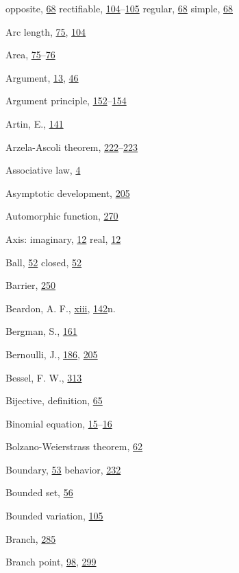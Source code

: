 \begin{theindex}
\subitem opposite, \hyperlink{orig-p68}{68}
\subitem rectifiable, \hyperlink{orig-p104}{104}--\hyperlink{orig-p105}{105}
\subitem regular, \hyperlink{orig-p68}{68}
\subitem simple, \hyperlink{orig-p68}{68}
\item Arc length, \hyperlink{orig-p75}{75}, \hyperlink{orig-p104}{104}
\item Area, \hyperlink{orig-p75}{75}--\hyperlink{orig-p76}{76}
\item Argument, \hyperlink{orig-p13}{13}, \hyperlink{orig-p46}{46}
\item Argument principle, \hyperlink{orig-p152}{152}--\hyperlink{orig-p154}{154}
\item Artin, E., \hyperlink{orig-p141}{141}
\item Arzela-Ascoli theorem, \hyperlink{orig-p222}{222}--\hyperlink{orig-p223}{223}
\item Associative law, \hyperlink{orig-p4}{4}
\item Asymptotic development, \hyperlink{orig-p205}{205}
\item Automorphic function, \hyperlink{orig-p270}{270}
\item Axis:
\subitem imaginary, \hyperlink{orig-p12}{12}
\subitem real, \hyperlink{orig-p12}{12}
\item Ball, \hyperlink{orig-p52}{52}
\subitem closed, \hyperlink{orig-p52}{52}
\item Barrier, \hyperlink{orig-p250}{250}
\item Beardon, A. F., \hyperlink{orig-front-xiii}{xiii}, \hyperlink{orig-p142}{142}n.
\item Bergman, S., \hyperlink{orig-p161}{161}
\item Bernoulli, J., \hyperlink{orig-p186}{186}, \hyperlink{orig-p205}{205}
\item Bessel, F. W., \hyperlink{orig-p313}{313}
\item Bijective, definition, \hyperlink{orig-p65}{65}
\item Binomial equation, \hyperlink{orig-p15}{15}--\hyperlink{orig-p16}{16}
\item Bolzano-Weierstrass theorem, \hyperlink{orig-p62}{62}
\item Boundary, \hyperlink{orig-p53}{53}
\subitem behavior, \hyperlink{orig-p232}{232}
\item Bounded set, \hyperlink{orig-p56}{56}
\item Bounded variation, \hyperlink{orig-p105}{105}
\item Branch, \hyperlink{orig-p285}{285}
\item Branch point, \hyperlink{orig-p98}{98}, \hyperlink{orig-p299}{299}

\end{theindex}
